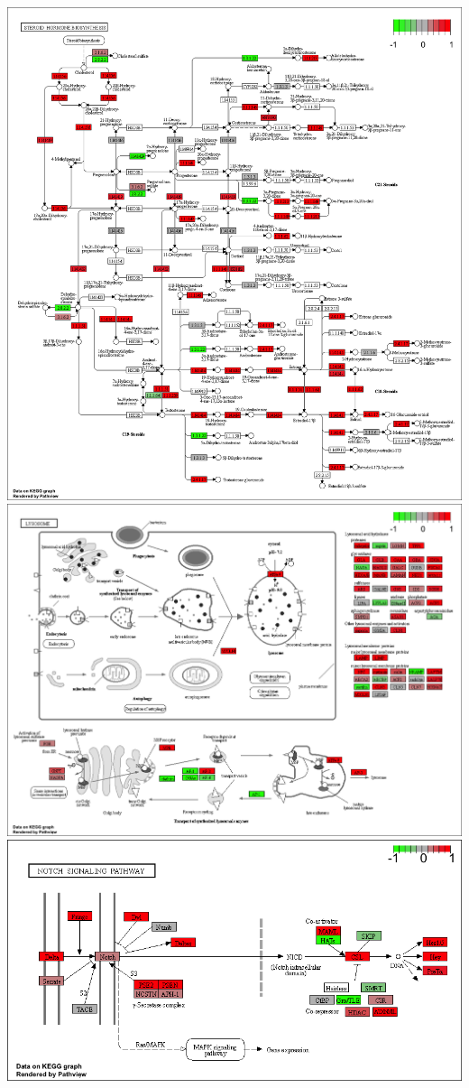\documentclass[
]{article}
\begin{document}
\includegraphics{hsa00140.pathview.png}
\includegraphics{hsa04142.pathview.png}
\includegraphics{hsa04330.pathview.png}
\end{document}
